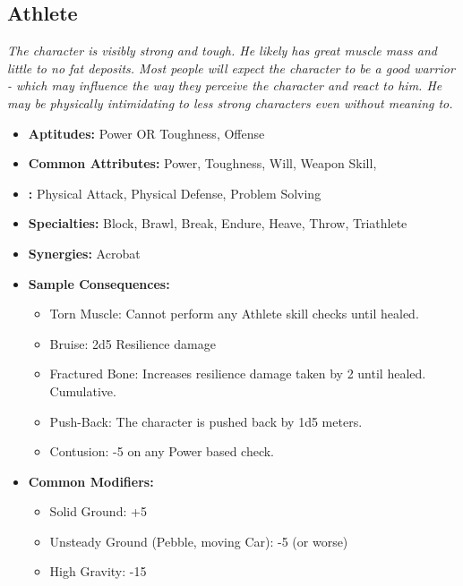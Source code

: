 \subsection{Athlete}\label{Athlete}
\textit{The character is visibly strong and tough.
He likely has great muscle mass and little to no fat deposits.
Most people will expect the character to be a good warrior - which may influence the way they perceive the character and react to him.
He may be physically intimidating to less strong characters even without meaning to.}
\begin{itemize}
	\item \textbf{Aptitudes:} Power OR Toughness, Offense
	\item \textbf{Common Attributes:} Power, Toughness, Will, Weapon Skill, 
	\item \textbf{:} Physical Attack, Physical Defense, Problem Solving
	\item \textbf{Specialties:} Block, Brawl, Break, Endure, Heave, Throw, Triathlete
	\item \textbf{Synergies:} Acrobat
	\item \textbf{Sample Consequences:} 
	\begin{itemize}
		\item Torn Muscle: Cannot perform any Athlete skill checks until healed.
		\item Bruise: 2d5 Resilience damage
		\item Fractured Bone: Increases resilience damage taken by 2 until healed. Cumulative.
		\item Push-Back: The character is pushed back by 1d5 meters.
		\item Contusion: -5 on any Power based check.
	\end{itemize}
	\item \textbf{Common Modifiers:}
	\begin{itemize}
		\item Solid Ground: +5
		\item Unsteady Ground (Pebble, moving Car): -5 (or worse)
		\item High Gravity: -15
	\end{itemize}
\end{itemize}


